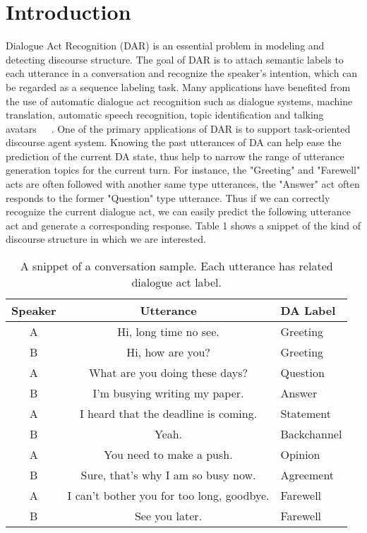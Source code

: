 \documentclass[sigconf]{acmart}
\begin{document}
\section{Introduction}
Dialogue Act Recognition (DAR) is an essential problem in modeling and detecting discourse structure. The goal of DAR is to attach semantic labels to each utterance in a conversation and recognize the speaker's intention, which can be regarded as a sequence labeling task. Many applications have benefited from the use of automatic dialogue act recognition such as dialogue systems, machine translation, automatic speech recognition, topic identification and talking avatars~\cite{Khanpour2016Dialogue}~\cite{kral2012dialogue}~\cite{higashinaka2014towards}. One of the primary applications of DAR is to support task-oriented discourse agent system. Knowing the past utterances of DA can help ease the prediction of the current DA state, thus help to narrow the range of utterance generation topics for the current turn. For instance, the "Greeting" and "Farewell" acts are often followed with another same type utterances, the "Answer" act often responds to the former "Question" type utterance. Thus if we can correctly recognize the current dialogue act, we can easily predict the following utterance act and generate a corresponding response. Table 1 shows a snippet of the kind of discourse structure in which we are interested.

\begin{table}
	\begin{tabular}{ccl}
		\toprule
		Speaker    &Utterance       &DA Label\\
		\midrule
		A &Hi, long time no see.& Greeting\\
		B &Hi, how are you? & Greeting\\
		A &What are you doing these days? &Question \\
		B &I'm busying writing my paper. &Answer\\
		A &I heard that the deadline is coming. &Statement\\
		B &Yeah. &Backchannel \\
		A &You need to make a push.&Opinion \\
		B &Sure, that's why I am so busy now.&Agreement\\
		A &I can't bother you for too long, goodbye. &Farewell\\
		B &See you later. &Farewell\\
		\bottomrule
	\end{tabular}
\caption{ A snippet of a conversation sample. Each utterance has related dialogue act label.}
\end{table}
\end{document}
